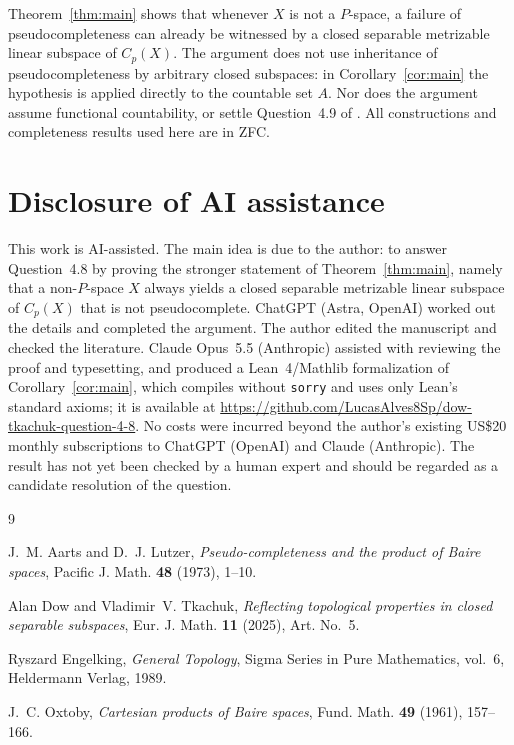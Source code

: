 \documentclass{amsart}
\theoremstyle{remark}
\begin{document}
Theorem~\ref{thm:main} shows that whenever $X$ is not a $P$-space, a failure of pseudocompleteness can already be witnessed by a closed separable metrizable linear subspace of $C_p(X)$. The argument does not use inheritance of pseudocompleteness by arbitrary closed subspaces: in Corollary~\ref{cor:main} the hypothesis is applied directly to the countable set $A$. Nor does the argument assume functional countability, or settle Question~4.9 of \cite{DT}. All constructions and completeness results used here are in ZFC.

\section*{Disclosure of AI assistance}

This work is AI-assisted. The main idea is due to the author: to answer Question~4.8 by proving the stronger statement of Theorem~\ref{thm:main}, namely that a non-$P$-space $X$ always yields a closed separable metrizable linear subspace of $C_p(X)$ that is not pseudocomplete. ChatGPT (Astra, OpenAI) worked out the details and completed the argument. The author edited the manuscript and checked the literature. Claude Opus~5.5 (Anthropic) assisted with reviewing the proof and typesetting, and produced a Lean~4/Mathlib formalization of Corollary~\ref{cor:main}, which compiles without \texttt{sorry} and uses only Lean's standard axioms; it is available at \url{https://github.com/LucasAlves8Sp/dow-tkachuk-question-4-8}. No costs were incurred beyond the author's existing US\$20 monthly subscriptions to ChatGPT (OpenAI) and Claude (Anthropic). The result has not yet been checked by a human expert and should be regarded as a candidate resolution of the question.

\begin{thebibliography}{9}

J.~M. Aarts and D.~J. Lutzer, \emph{Pseudo-completeness and the product of Baire spaces}, Pacific J. Math. \textbf{48} (1973), 1--10.

Alan Dow and Vladimir~V. Tkachuk, \emph{Reflecting topological properties in closed separable subspaces}, Eur. J. Math. \textbf{11} (2025), Art. No.~5.

Ryszard Engelking, \emph{General Topology}, Sigma Series in Pure Mathematics, vol.~6, Heldermann Verlag, 1989.

J.~C. Oxtoby, \emph{Cartesian products of Baire spaces}, Fund. Math. \textbf{49} (1961), 157--166.

\end{thebibliography}
\end{document}
